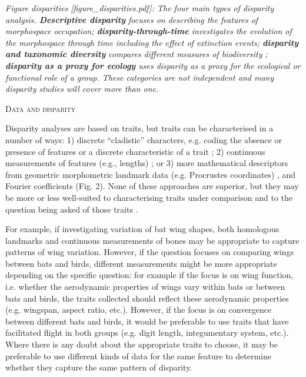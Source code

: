 \documentclass[12pt,letterpaper]{article}
\renewcommand{\section}[1]{%
\bigskip
\begin{center}
\begin{Large}
\normalfont\scshape #1
\medskip
\end{Large}
\end{center}}
\begin{document}

\textit{Figure disparities {[}figure\_disparities.pdf{]}: The four main types of disparity analysis. \textbf{Descriptive disparity} focuses on describing the features of morphospace occupation; \textbf{disparity-through-time} investigates the evolution of the morphospace through time including the effect of extinction events; \textbf{disparity and taxonomic diversity} compares different measures of biodiversity ; \textbf{disparity as a proxy for ecology} uses disparity as a proxy for the ecological or functional role of a group.
These categories are not independent and many disparity studies will cover more than one.}



\section{Data and disparity}

Disparity analyses are based on traits, but traits can be characterised in a number of ways:
	1) discrete ``cladistic'' characters, e.g. coding the absence or presence of features or a discrete characteristic of a trait \citep[][e.g]{Close2015-qi};
	2) continuous measurements of features (e.g., lengths) \citep[][e.g]{Anderson2001-qb}; or
	3) more mathematical descriptors from geometric morphometric landmark data (e.g. Procrustes coordinates) \citep[][e.g]{Cooney2017-ly}, and Fourier coefficients \citep[][e.g]{Foote1995-do, Spriggs2018-nu} (Fig. 2).
None of these approaches are superior, but they may be more or less well-suited to characterising traits under comparison and to the question being asked of those traits \citep{hetherington2015cladistic,Hopkins2017-cf}.


For example, if investigating variation of bat wing shapes, both homologous landmarks and continuous measurements of bones may be appropriate to capture patterns of wing variation.
However, if the question focuses on comparing wings between bats and birds, different measurements might be more appropriate depending on the specific question: for example if the focus is on wing function, i.e. whether the aerodynamic properties of wings vary within bats or between bats and birds, the traits collected should reflect these aerodynamic properties (e.g. wingspan, aspect ratio, etc.).
However, if the focus is on convergence between different bats and birds, it would be preferable to use traits that have facilitated flight in both groups (e.g. digit length, integumentary system, etc.).
Where there is any doubt about the appropriate traits to choose, it may be preferable to use different kinds of data for the same feature to determine whether they capture the same pattern of disparity.
\end{document}
